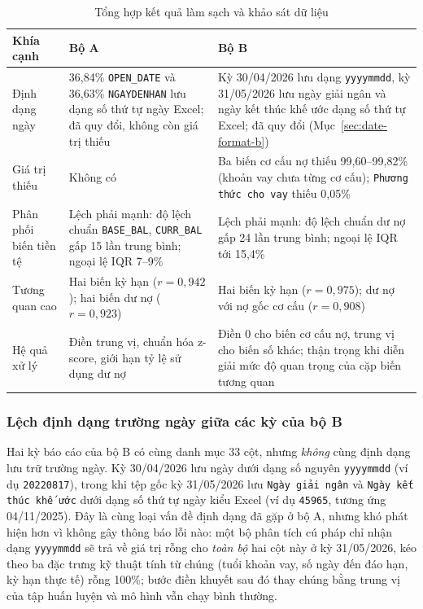 \begin{table}[H]
\centering
\caption{Tổng hợp kết quả làm sạch và khảo sát dữ liệu}
\label{tab:eda-summary}
\begin{tabular}{|p{2.9cm}|p{5.2cm}|p{5.4cm}|}
\hline
\textbf{Khía cạnh} & \textbf{Bộ A} & \textbf{Bộ B}\\
\hline
Định dạng ngày & 36,84\% \mbox{\texttt{OPEN\_DATE}} và 36,63\% \mbox{\texttt{NGAYDENHAN}} lưu dạng số thứ tự ngày Excel; đã quy đổi, không còn giá trị thiếu & Kỳ 30/04/2026 lưu dạng \texttt{yyyymmdd}, kỳ 31/05/2026 lưu ngày giải ngân và ngày kết thúc khế ước dạng số thứ tự Excel; đã quy đổi (Mục~\ref{sec:date-format-b})\\
\hline
Giá trị thiếu & Không có & Ba biến cơ cấu nợ thiếu 99,60--99,82\% (khoản vay chưa từng cơ cấu); \texttt{Phương thức cho vay} thiếu 0,05\%\\
\hline
Phân phối biến tiền tệ & Lệch phải mạnh: độ lệch chuẩn \mbox{\texttt{BASE\_BAL}}, \mbox{\texttt{CURR\_BAL}} gấp 15 lần trung bình; ngoại lệ IQR 7--9\% & Lệch phải mạnh: độ lệch chuẩn dư nợ gấp 24 lần trung bình; ngoại lệ IQR tới 15,4\%\\
\hline
Tương quan cao & Hai biến kỳ hạn ($r=0,942$); hai biến dư nợ ($r=0,923$) & Hai biến kỳ hạn ($r=0,975$); dư nợ với nợ gốc cơ cấu ($r=0,908$)\\
\hline
Hệ quả xử lý & Điền trung vị, chuẩn hóa z-score, giới hạn tỷ lệ sử dụng dư nợ & Điền 0 cho biến cơ cấu nợ, trung vị cho biến số khác; thận trọng khi diễn giải mức độ quan trọng của cặp biến tương quan\\
\hline
\end{tabular}
\end{table}

\subsubsection*{Lệch định dạng trường ngày giữa các kỳ của bộ B}
\label{sec:date-format-b}

Hai kỳ báo cáo của bộ B có cùng danh mục 33 cột, nhưng \emph{không} cùng định dạng lưu trữ trường ngày. Kỳ 30/04/2026 lưu ngày dưới dạng số nguyên \texttt{yyyymmdd} (ví dụ \texttt{20220817}), trong khi tệp gốc kỳ 31/05/2026 lưu \texttt{Ngày giải ngân} và \texttt{Ngày kết thúc khế ước} dưới dạng số thứ tự ngày kiểu Excel (ví dụ \texttt{45965}, tương ứng 04/11/2025). Đây là cùng loại vấn đề định dạng đã gặp ở bộ A, nhưng khó phát hiện hơn vì không gây thông báo lỗi nào: một bộ phân tích cú pháp chỉ nhận dạng \texttt{yyyymmdd} sẽ trả về giá trị rỗng cho \emph{toàn bộ} hai cột này ở kỳ 31/05/2026, kéo theo ba đặc trưng kỹ thuật tính từ chúng (tuổi khoản vay, số ngày đến đáo hạn, kỳ hạn thực tế) rỗng 100\%; bước điền khuyết sau đó thay chúng bằng trung vị của tập huấn luyện và mô hình vẫn chạy bình thường.

